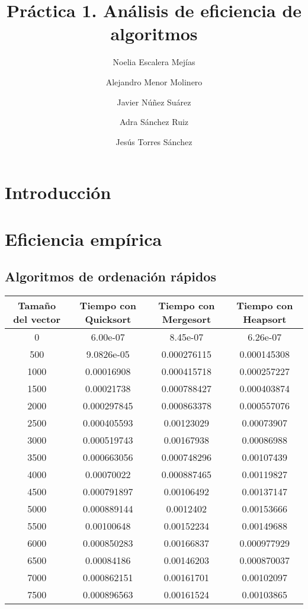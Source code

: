 \documentclass{article}
\title{Práctica 1. Análisis de eficiencia de algoritmos}
\author{Noelia Escalera Mejías\\
		\and Alejandro Menor Molinero\\
		\and Javier Núñez Suárez\\
		\and Adra Sánchez Ruiz
		\and Jesús Torres Sánchez}
\begin{document}
	\maketitle
	\section{Introducción}
	\section{Eficiencia empírica}
	\subsection{Algoritmos de ordenación rápidos}
		\begin{longtable}{|c|c|c|c|}
			\hline
			Tamaño del vector & Tiempo con Quicksort & Tiempo con Mergesort & Tiempo con Heapsort \\ \hline
			0	   &  6.00e-07	    &   8.45e-07	 &  6.26e-07      \\ \hline
			500	   &  9.0826e-05    & 	0.000276115	 &  0.000145308  \\ \hline
			1000   &  0.00016908    & 	0.000415718	 &  0.000257227  \\ \hline
			1500   &  0.00021738    & 	0.000788427	 &  0.000403874  \\ \hline
			2000   &  0.000297845   & 	0.000863378	 &  0.000557076  \\ \hline
			2500   &  0.000405593   & 	0.00123029	 &  0.00073907  \\ \hline
			3000   &  0.000519743   & 	0.00167938	 &  0.00086988  \\ \hline
			3500   &  0.000663056   & 	0.000748296	 &  0.00107439  \\ \hline
			4000   &  0.00070022    & 	0.000887465	 &  0.00119827  \\ \hline
			4500   &  0.000791897   & 	0.00106492	 &  0.00137147  \\ \hline
			5000   &  0.000889144   & 	0.0012402	 &  0.00153666  \\ \hline
			5500   &  0.00100648    & 	0.00152234	 &  0.00149688  \\ \hline
			6000   &  0.000850283   & 	0.00166837	 &  0.000977929  \\ \hline
			6500   &  0.00084186    & 	0.00146203	 &  0.000870037  \\ \hline
	    	7000   &  0.000862151   & 	0.00161701	 &  0.00102097  \\ \hline
		    7500   &  0.000896563   & 	0.00161524	 &  0.00103865  \\ \hline

\end{longtable}
\end{document}
